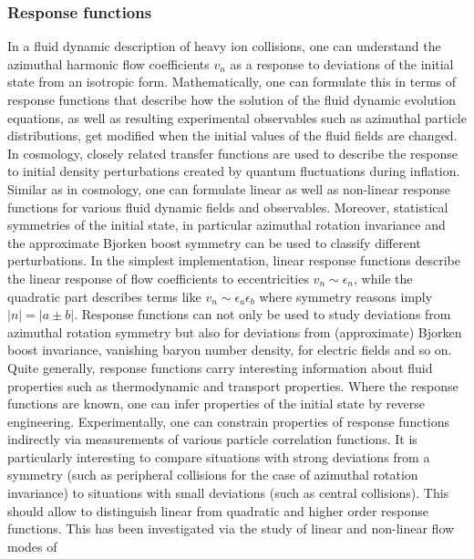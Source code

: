 \subsubsection{Response functions}
In a fluid dynamic description of heavy ion collisions,  one can understand 
  the azimuthal harmonic flow coefficients $v_n$ as a response to deviations 
  of the initial state from an isotropic form. 
Mathematically,  one can formulate this in terms of response functions that 
  describe how the solution of the fluid dynamic evolution equations,  
  as well as resulting experimental observables such as azimuthal particle 
  distributions, get modified when the initial values of the fluid fields 
  are changed. 
In cosmology, closely related transfer functions are used to describe the 
  response to initial density perturbations created by quantum fluctuations 
  during inflation. Similar as in cosmology,  one can formulate linear as 
  well as non-linear response functions for various fluid dynamic fields 
  and observables. 
Moreover,  statistical symmetries of the initial state,  in particular 
  azimuthal rotation invariance and the approximate Bjorken boost symmetry 
  can be used to classify different perturbations. 
In the simplest implementation,  linear response functions describe the 
  linear response of flow coefficients to eccentricities $v_n \sim\epsilon_n$,  
  while the quadratic part describes terms like $v_n \sim \epsilon_a\epsilon_b$ 
  where symmetry reasons imply $|n|=|a\pm b|$. 
Response functions can not only be used to study deviations from azimuthal 
  rotation symmetry but also for deviations from (approximate) Bjorken boost 
  invariance,  vanishing baryon number density, for electric fields and so on. 
Quite generally, response functions carry interesting information about fluid 
  properties such as thermodynamic and transport properties. 
  Where the response functions are known, one can infer properties of the 
  initial state by reverse engineering.
Experimentally, one can constrain properties of response functions indirectly 
  via measurements of various particle correlation functions. 
It is particularly interesting to compare situations with strong deviations 
  from a symmetry (such as peripheral collisions for the case of azimuthal 
  rotation invariance) to situations with small deviations (such as central collisions). 
This should allow to distinguish linear from quadratic and higher order response functions.
This has been investigated via the study of linear and non-linear flow modes of

